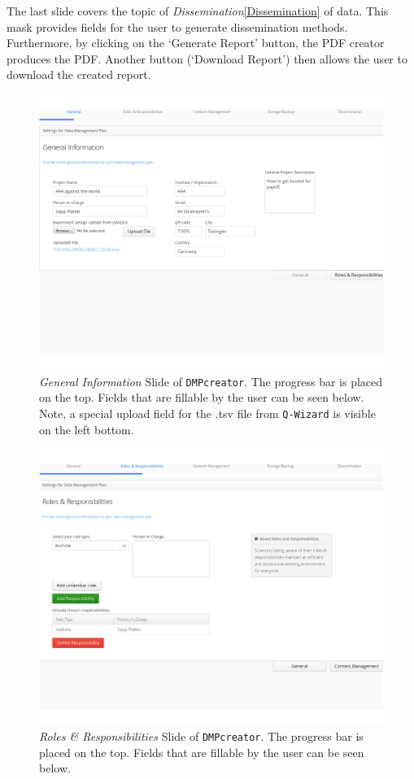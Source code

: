 The last slide covers the topic of \textit{Dissemination}\ref{Dissemination} of data. This mask provides fields for the user to generate dissemination methods. Furthermore, by clicking on the `Generate Report' button, the PDF creator produces the PDF. Another button (`Download Report') then allows the user to download the created report.
\begin{landscape}
	\begin{figure}[]
		\centering
		\includegraphics[width=1.2\textwidth]{pictures/GeneralInformation.png}
		\caption{\textit{General Information} Slide of \texttt{DMPcreator}. The progress bar is placed on the top. Fields that are fillable by the user can be seen below. Note, a special upload field for the .tsv file from \texttt{Q-Wizard} is visible on the left bottom.}
		\label{GeneralInformationSlide}
	\end{figure}

\begin{figure}[]
	\centering
	\includegraphics[width=1.2\textwidth]{pictures/RolesResponsibilities.png}
	\caption{\textit{Roles \& Responsibilities} Slide of \texttt{DMPcreator}. The progress bar is placed on the top. Fields that are fillable by the user can be seen below.}
	\label{RolesResponsibilitiesSlide}
\end{figure}


\end{landscape}
